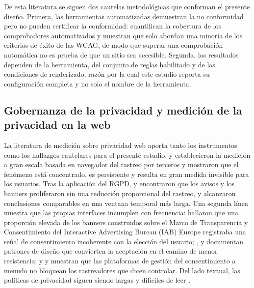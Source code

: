 \documentclass[pdflatex,sn-basic,Numbered,iicol]{sn-jnl}
\theoremstyle{thmstyleone}
\theoremstyle{thmstyletwo}
\theoremstyle{thmstylethree}
\begin{document}
De esta literatura se siguen dos cautelas metodol\'ogicas que conforman el presente dise\~no. Primera, las herramientas automatizadas demuestran la no conformidad pero no pueden certificar la conformidad: \citet{fischer2025coverage} cuantifican la cobertura de los comprobadores automatizados y muestran que solo abordan una minor\'ia de los criterios de \'exito de las WCAG, de modo que superar una comprobaci\'on autom\'atica no es prueba de que un sitio sea accesible. Segunda, los resultados dependen de la herramienta, del conjunto de reglas habilitado y de las condiciones de renderizado, raz\'on por la cual este estudio reporta su configuraci\'on completa y no solo el nombre de la herramienta.

\subsection{Gobernanza de la privacidad y medici\'on de la privacidad en la web}\label{sec:related-privacy}

La literatura de medici\'on sobre privacidad web aporta tanto los instrumentos como los hallazgos cautelares para el presente estudio. \citet{libert2015exposing} y \citet{englehardt2016online} establecieron la medici\'on a gran escala basada en navegador del rastreo por terceros y mostraron que el fen\'omeno est\'a concentrado, es persistente y resulta en gran medida invisible para los usuarios. Tras la aplicaci\'on del RGPD, \citet{degeling2019value} y \citet{trevisan2019four} encontraron que los avisos y los banners proliferaron sin una reducci\'on proporcional del rastreo, y \citet{kretschmer2021cookie} alcanzaron conclusiones comparables en una ventana temporal m\'as larga. Una segunda l\'inea muestra que las propias interfaces incumplen con frecuencia: \citet{matte2020cookie} hallaron que una proporci\'on elevada de los banners construidos sobre el Marco de Transparencia y Consentimiento del Interactive Advertising Bureau (IAB) Europe registraba una se\~nal de consentimiento incoherente con la elecci\'on del usuario; \citet{nouwens2020dark}, \citet{gray2021dark} y \citet{habib2022okay} documentan patrones de dise\~no que convierten la aceptaci\'on en el camino de menor resistencia; y \citet{sanchezrola2019can} y \citet{bollinger2022automating} muestran que las plataformas de gesti\'on del consentimiento a menudo no bloquean los rastreadores que dicen controlar. Del lado textual, las pol\'iticas de privacidad siguen siendo largas y dif\'iciles de leer \citep{fabian2017largescale,belcheva2023understanding}.
\end{document}
